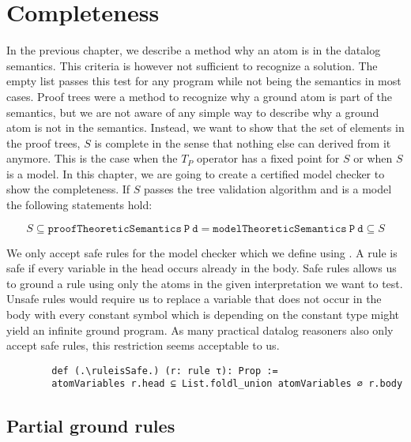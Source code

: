 \chapter{Completeness}\label{sec:completeness}

    In the previous chapter, we describe a method why an atom is in the datalog semantics. This criteria is however not sufficient to recognize a solution. The empty list passes this test for any program while not being the semantics in most cases. Proof trees were a method to recognize why a ground atom is part of the semantics, but we are not aware of any simple way to describe why a ground atom is not in the semantics. Instead, we want to show that the set of elements in the proof trees, $S$ is complete in the sense that nothing else can derived from it anymore. This is the case when the $T_P$ operator has a fixed point for $S$ or when $S$ is a model. In this chapter, we are going to create a certified model checker to show the completeness. If $S$ passes the tree validation algorithm and is a model the following statements hold:

    \[ S \subseteq \mathtt{proofTheoreticSemantics\ P\ d} = \mathtt{modelTheoreticSemantics\ P\ d} \subseteq S \]

    We only accept safe rules for the model checker which we define using \atomVariables. A rule is safe if every variable in the head occurs already in the body. Safe rules allows us to ground a rule using only the atoms in the given interpretation we want to test. Unsafe rules would require us to replace a variable that does not occur in the body with every constant symbol which is depending on the constant type might yield an infinite ground program. As many practical datalog reasoners also only accept safe rules, this restriction seems acceptable to us.

    \begin{lstlisting}
        def (.\ruleisSafe.) (r: rule τ): Prop := 
        atomVariables r.head ⊆ List.foldl_union atomVariables ∅ r.body

    \end{lstlisting}

    \section{Partial ground rules}
    
